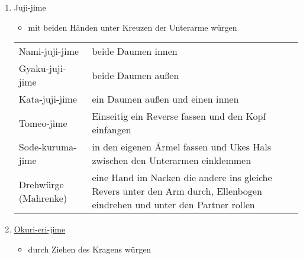 \documentclass[justified, a4paper, notitlepage, captions=tableheading, nobib]{tufte-handout}
\begin{document}
\begin{enumerate}
\item Juji-jime
\label{sec:org89ab3b5}
\begin{itemize}
\item mit beiden Händen unter Kreuzen der Unterarme würgen
\end{itemize}

\begin{center}
\begin{tabular}{ll}
\label{org9bf3950}Nami-juji-jime & beide Daumen innen\\
\label{org8d8f888}Gyaku-juji-jime & beide Daumen außen\\
\label{org7081c5f}Kata-juji-jime & ein Daumen außen und einen innen\\
\label{org83e4891}Tomeo-jime & Einseitig ein Reverse fassen und den Kopf einfangen\\
\label{orga86277e}Sode-kuruma-jime & in den eigenen Ärmel fassen und Ukes Hals zwischen den Unterarmen einklemmen\\
\label{org58795e5}Drehwürge (Mahrenke) & eine Hand im Nacken die andere ins gleiche Revers unter den Arm durch, Ellenbogen eindrehen und unter den Partner rollen\\
\end{tabular}
\end{center}

\item \hyperref[org55ecd66]{Okuri-eri-jime}
\label{sec:org3a3bea7}
\begin{itemize}
\item durch Ziehen des Kragens würgen
\end{itemize}


\end{enumerate}
\end{document}
